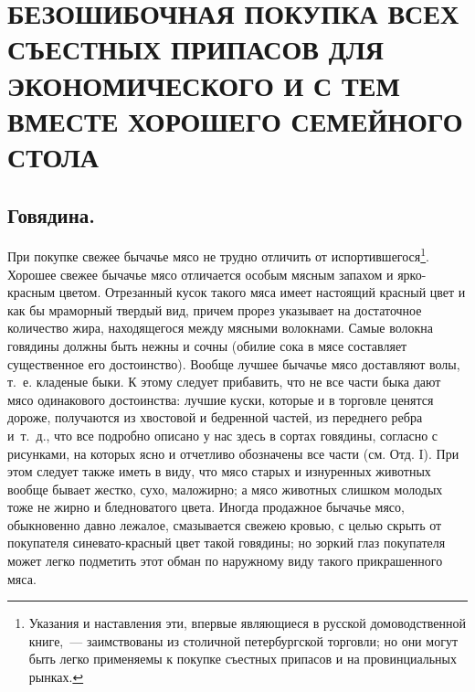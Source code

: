\section{БЕЗОШИБОЧНАЯ ПОКУПКА ВСЕХ СЪЕСТНЫХ ПРИПАСОВ ДЛЯ ЭКОНОМИЧЕСКОГО И С ТЕМ ВМЕСТЕ ХОРОШЕГО СЕМЕЙНОГО СТОЛА} %

\subsection{Говядина.}
При покупке свежее бычачье мясо не трудно отличить от испортившегося\footnote{Указания и наставления эти, впервые являющиеся в русской домоводственной книге,~--- заимствованы из столичной петербургской торговли; но они могут быть легко применяемы к покупке съестных припасов и на провинциальных рынках.}. Хорошее свежее бычачье мясо отличается особым мясным запахом и ярко-красным цветом. Отрезанный кусок такого мяса имеет настоящий красный цвет и как бы мраморный твердый вид, причем прорез указывает на достаточное количество жира, находящегося между мясными волокнами. Самые волокна говядины должны быть нежны и сочны (обилие сока в мясе составляет существенное его достоинство). Вообще лучшее бычачье мясо доставляют волы, т.~е. кладеные быки. К этому следует прибавить, что не все части быка дают мясо одинакового достоинства: лучшие куски, которые и в торговле ценятся дороже, получаются из хвостовой и бедренной частей, из переднего ребра и~т.~д., что все подробно описано у нас здесь в сортах говядины, согласно с рисунками, на которых ясно и отчетливо обозначены все части (см. Отд. I). При этом следует также иметь в виду, что мясо старых и изнуренных животных вообще бывает жестко, сухо, маложирно; а мясо животных слишком молодых тоже не жирно и бледноватого цвета. Иногда продажное бычачье мясо, обыкновенно давно лежалое, смазывается свежею кровью, с целью скрыть от покупателя синевато-красный цвет такой говядины; но зоркий глаз покупателя может легко подметить этот обман по наружному виду такого прикрашенного мяса.

